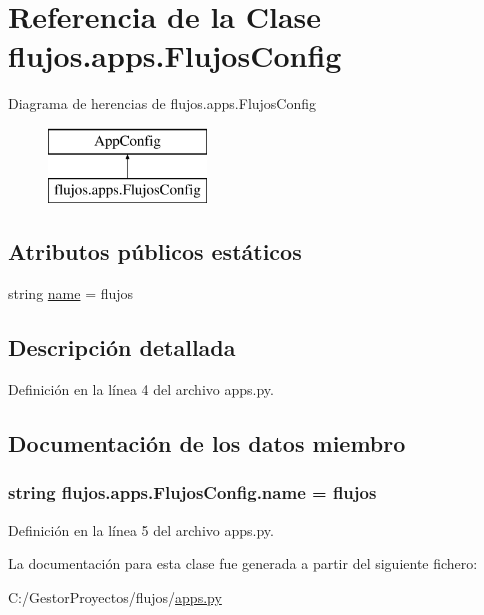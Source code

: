 \hypertarget{classflujos_1_1apps_1_1_flujos_config}{}\section{Referencia de la Clase flujos.\+apps.\+Flujos\+Config}
\label{classflujos_1_1apps_1_1_flujos_config}
Diagrama de herencias de flujos.\+apps.\+Flujos\+Config\begin{figure}[H]
\begin{center}
\leavevmode
\includegraphics[height=2.000000cm]{classflujos_1_1apps_1_1_flujos_config}
\end{center}
\end{figure}
\subsection*{Atributos públicos estáticos}
\begin{DoxyCompactItemize}
\item 
string \hyperlink{classflujos_1_1apps_1_1_flujos_config_a642a6394595c2e163905608673472dce}{name} = \textquotesingle{}flujos\textquotesingle{}
\end{DoxyCompactItemize}


\subsection{Descripción detallada}


Definición en la línea 4 del archivo apps.\+py.



\subsection{Documentación de los datos miembro}
\subsubsection[{\texorpdfstring{name}{name}}]{\setlength{\rightskip}{0pt plus 5cm}string flujos.\+apps.\+Flujos\+Config.\+name = \textquotesingle{}flujos\textquotesingle{}\hspace{0.3cm}{\ttfamily [static]}}\hypertarget{classflujos_1_1apps_1_1_flujos_config_a642a6394595c2e163905608673472dce}{}\label{classflujos_1_1apps_1_1_flujos_config_a642a6394595c2e163905608673472dce}


Definición en la línea 5 del archivo apps.\+py.



La documentación para esta clase fue generada a partir del siguiente fichero\+:\begin{DoxyCompactItemize}
\item 
C\+:/\+Gestor\+Proyectos/flujos/\hyperlink{flujos_2apps_8py}{apps.\+py}\end{DoxyCompactItemize}

